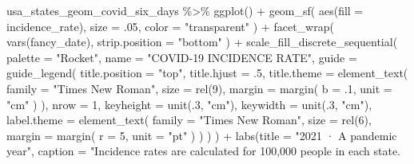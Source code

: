 \documentclass[
]{book}
\newenvironment{Shaded}{\begin{snugshade}}{\end{snugshade}}
\newcommand{\AttributeTok}[1]{\textcolor[rgb]{0.77,0.63,0.00}{#1}}
\newcommand{\DecValTok}[1]{\textcolor[rgb]{0.00,0.00,0.81}{#1}}
\newcommand{\FunctionTok}[1]{\textcolor[rgb]{0.00,0.00,0.00}{#1}}
\newcommand{\NormalTok}[1]{#1}
\newcommand{\SpecialCharTok}[1]{\textcolor[rgb]{0.00,0.00,0.00}{#1}}
\newcommand{\StringTok}[1]{\textcolor[rgb]{0.31,0.60,0.02}{#1}}
\begin{document}
\begin{Shaded}
\begin{Highlighting}[]
\NormalTok{usa\_states\_geom\_covid\_six\_days }\SpecialCharTok{\%\textgreater{}\%}
  \FunctionTok{ggplot}\NormalTok{() }\SpecialCharTok{+}
  \FunctionTok{geom\_sf}\NormalTok{(}
    \FunctionTok{aes}\NormalTok{(}\AttributeTok{fill =}\NormalTok{ incidence\_rate),}
    \AttributeTok{size =}\NormalTok{ .}\DecValTok{05}\NormalTok{,}
    \AttributeTok{color =} \StringTok{"transparent"}
\NormalTok{  ) }\SpecialCharTok{+}
  \FunctionTok{facet\_wrap}\NormalTok{(}
    \FunctionTok{vars}\NormalTok{(fancy\_date),}
    \AttributeTok{strip.position =} \StringTok{"bottom"}
\NormalTok{  ) }\SpecialCharTok{+}
  \FunctionTok{scale\_fill\_discrete\_sequential}\NormalTok{(}
    \AttributeTok{palette =} \StringTok{"Rocket"}\NormalTok{,}
    \AttributeTok{name =} \StringTok{"COVID{-}19 INCIDENCE RATE"}\NormalTok{,}
    \AttributeTok{guide =} \FunctionTok{guide\_legend}\NormalTok{(}
      \AttributeTok{title.position =} \StringTok{"top"}\NormalTok{,}
      \AttributeTok{title.hjust =}\NormalTok{ .}\DecValTok{5}\NormalTok{,}
      \AttributeTok{title.theme =} \FunctionTok{element\_text}\NormalTok{(}
        \AttributeTok{family =} \StringTok{"Times New Roman"}\NormalTok{,}
        \AttributeTok{size =} \FunctionTok{rel}\NormalTok{(}\DecValTok{9}\NormalTok{),}
        \AttributeTok{margin =} \FunctionTok{margin}\NormalTok{(}
          \AttributeTok{b =}\NormalTok{ .}\DecValTok{1}\NormalTok{,}
          \AttributeTok{unit =} \StringTok{"cm"}
\NormalTok{        )}
\NormalTok{      ),}
      \AttributeTok{nrow =} \DecValTok{1}\NormalTok{,}
      \AttributeTok{keyheight =} \FunctionTok{unit}\NormalTok{(.}\DecValTok{3}\NormalTok{, }\StringTok{"cm"}\NormalTok{),}
      \AttributeTok{keywidth =} \FunctionTok{unit}\NormalTok{(.}\DecValTok{3}\NormalTok{, }\StringTok{"cm"}\NormalTok{),}
      \AttributeTok{label.theme =} \FunctionTok{element\_text}\NormalTok{(}
        \AttributeTok{family =} \StringTok{"Times New Roman"}\NormalTok{,}
        \AttributeTok{size =} \FunctionTok{rel}\NormalTok{(}\DecValTok{6}\NormalTok{),}
        \AttributeTok{margin =} \FunctionTok{margin}\NormalTok{(}
          \AttributeTok{r =} \DecValTok{5}\NormalTok{,}
          \AttributeTok{unit =} \StringTok{"pt"}
\NormalTok{        )}
\NormalTok{      )}
\NormalTok{    )}
\NormalTok{  ) }\SpecialCharTok{+}
  \FunctionTok{labs}\NormalTok{(}\AttributeTok{title =} \StringTok{"2021 · A pandemic year"}\NormalTok{,}
       \AttributeTok{caption =} \StringTok{"Incidence rates are calculated for 100,000 people in each state.}

\end{Highlighting}
\end{Shaded}
\end{document}

